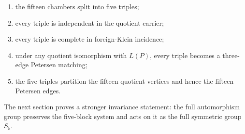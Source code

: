 \begin{enumerate}
    \item the fifteen chambers split into five triples;
    \item every triple is independent in the quotient carrier;
    \item every triple is complete in foreign-Klein incidence;
    \item under any quotient isomorphism with \(L(P)\), every triple
    becomes a three-edge Petersen matching;
    \item the five triples partition the fifteen quotient vertices and
    hence the fifteen Petersen edges.
\end{enumerate}

The next section proves a stronger invariance statement: the full
automorphism group preserves the five-block system and acts on it as
the full symmetric group \(S_5\).
